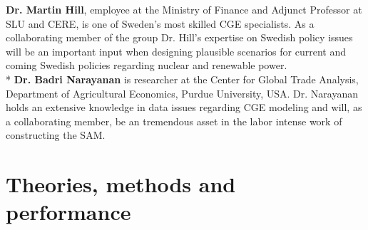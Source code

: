 \textbf{Dr. Martin Hill}, employee at the Ministry of Finance and Adjunct Professor at SLU and CERE, is one of Sweden's most skilled CGE specialists. As a collaborating member of the group Dr. Hill’s expertise on Swedish policy issues will be an important input when designing plausible scenarios for current and coming Swedish policies regarding nuclear and renewable power.\\*
\textbf{Dr. Badri Narayanan} is researcher at the Center for Global Trade Analysis, Department of Agricultural Economics, Purdue University, USA. Dr. Narayanan holds an extensive knowledge in data issues regarding CGE modeling and will, as a collaborating member, be an tremendous asset in the labor intense work of constructing the SAM.

\section{Theories, methods and performance}
\begin{comment}
	2 Method and performance
		• Feasibility and adequacy of scientific methods
		• Innovativeness and boldness of methodology
		• Concrete and realistic work plan
		• Concrete and realistic plan for scientific deliverables
		• Coordination of project and research group
		• Suitability of multi- and interdisciplinary approaches
		• Ethical considerations
		Clarifications:
		• Feasibility and adequacy of scientific approaches and methods should receive primary
			consideration
	3 Scientific competence
		• Quality of scientific publications
		• Ability to carry out the project according to plan
		• Adequate experience of project management
		• National and international activities, including projects, networks, assignments,
			commissions of trust, and participating at or arranging workshops or conferences
		• Strength and competitiveness of the research team
		Clarifications:
		• Quality of scientific publications should be assessed taking into account the
			standards within each scientific field
		• When several researchers collaborate, assessment of scientific competence is made
			both of each researcher separately and of the research group collectively
		• For starting mobility grants, strength and competitiveness of the research environment
			should be assessed for the home university and the host university
\end{comment}
